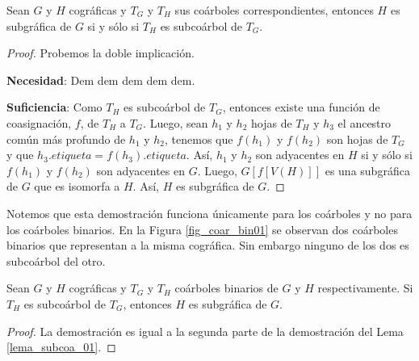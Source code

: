 \begin{lemma}\label{lema_subcoa_01}
    Sean $G$ y $H$ cográficas y $T_G$ y $T_H$ sus coárboles correspondientes, entonces $H$ es subgráfica de $G$ si y sólo si $T_H$ es subcoárbol de $T_G$. 
\end{lemma}

\begin{proof}

    Probemos la doble implicación.

    \textbf{Necesidad}: Dem dem dem dem dem.
    
    \textbf{Suficiencia}: Como $T_H$ es subcoárbol de $T_G$, entonces existe una función de coasignación, $f$, de $T_H$ a $T_G$. Luego, sean $h_1$ y $h_2$ hojas de $T_H$ y $h_3$ el ancestro común más profundo de $h_1$ y $h_2$, tenemos que $f(h_1)$ y $f(h_2)$ son hojas de $T_G$ y que $h_3.etiqueta = f(h_3).etiqueta$. Así, $h_1$ y $h_2$ son adyacentes en $H$ si y sólo si $f(h_1)$ y $f(h_2)$ son adyacentes en $G$. Luego, $G[f[V(H)]]$ es una subgráfica de $G$ que es isomorfa a $H$. Así, $H$ es subgráfica de $G$.
    
\end{proof}

Notemos que esta demostración funciona únicamente para los coárboles y no para los coárboles binarios. En la Figura \ref{fig_coar_bin01} se observan dos coárboles binarios que representan a la misma cográfica. Sin embargo ninguno de los dos es subcoárbol del otro.

\begin{lemma}
    Sean $G$ y $H$ cográficas y $T_G$ y $T_H$ coárboles binarios de $G$ y $H$ respectivamente. Si $T_H$ es subcoárbol de $T_G$, entonces $H$ es subgráfica de $G$. 
\end{lemma}

\begin{proof}
    La demostración es igual a la segunda parte de la demostración del Lema \ref{lema_subcoa_01}.
\end{proof}